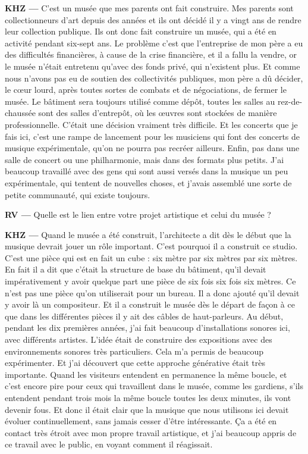 \documentclass[a4paper,12pt]{article}
\begin{document}
\textbf{KHZ ---} C'est un musée que mes parents ont fait construire. Mes parents sont collectionneurs d'art depuis des années et ils ont décidé il y a vingt ans de rendre leur collection publique. Ils ont donc fait construire un musée, qui a été en activité pendant six-sept ans. Le problème c'est que l'entreprise de mon père a eu des difficultés financières, à cause de la crise financière, et il a fallu la vendre, or le musée n'était entretenu qu'avec des fonds privé, qui n'existent plus. Et comme nous n'avons pas eu de soutien des collectivités publiques, mon père a dû décider, le cœur lourd, après toutes sortes de combats et de négociations, de fermer le musée. Le bâtiment sera toujours utilisé comme dépôt, toutes les salles au rez-de-chaussée sont des salles d'entrepôt, où les œuvres sont stockées de manière professionnelle. C'était une décision vraiment très difficile. Et les concerts que je fais ici, c'est une rampe de lancement pour les musiciens qui font des concerts de musique expérimentale, qu'on ne pourra pas recréer ailleurs. Enfin, pas dans une salle de concert ou une philharmonie, mais dans des formats plus petits. J'ai beaucoup travaillé avec des gens qui sont aussi versés dans la musique un peu expérimentale, qui tentent de nouvelles choses, et j'avais assemblé une sorte de petite communauté, qui existe toujours.

\textbf{RV ---} Quelle est le lien entre votre projet artistique et celui du musée ?

\textbf{KHZ ---} Quand le musée a été construit, l'architecte a dit dès le début que la musique devrait jouer un rôle important. C'est pourquoi il a construit ce studio. C'est une pièce qui est en fait un cube : six mètre par six mètres par six mètres. En fait il a dit que c'était la structure de base du bâtiment, qu'il devait impérativement y avoir quelque part une pièce de six fois six fois six mètres. Ce n'est pas une pièce qu'on utiliserait pour un bureau. Il a donc ajouté qu'il devait y avoir là un compositeur. Et il a construit le musée dès le départ de façon à ce que dans les différentes pièces il y ait des câbles de haut-parleurs. Au début, pendant les dix premières années, j'ai fait beaucoup d'installations sonores ici, avec différents artistes. L'idée était de construire des expositions avec des environnements sonores très particuliers. Cela m'a permis de beaucoup expérimenter. Et j'ai découvert que cette approche générative était très importante. Quand les visiteurs entendent en permanence la même boucle, et c'est encore pire pour ceux qui travaillent dans le musée, comme les gardiens, s'ils entendent pendant trois mois la même boucle toutes les deux minutes, ils vont devenir fous. Et donc il était clair que la musique que nous utilisons ici devait évoluer continuellement, sans jamais cesser d'être intéressante. Ça a été en contact très étroit avec mon propre travail artistique, et j'ai beaucoup appris de ce travail avec le public, en voyant comment il réagissait.
\end{document}
